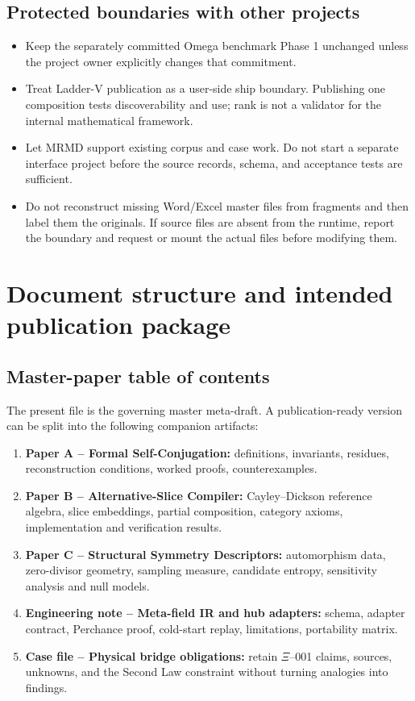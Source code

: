 \documentclass[11pt,oneside]{article}
\begin{document}
\subsection{Protected boundaries with other projects}
\begin{itemize}
  \item Keep the separately committed Omega benchmark Phase 1 unchanged unless the project owner explicitly changes that commitment.
  \item Treat Ladder-V publication as a user-side ship boundary. Publishing one composition tests discoverability and use; rank is not a validator for the internal mathematical framework.
  \item Let MRMD support existing corpus and case work. Do not start a separate interface project before the source records, schema, and acceptance tests are sufficient.
  \item Do not reconstruct missing Word/Excel master files from fragments and then label them the originals. If source files are absent from the runtime, report the boundary and request or mount the actual files before modifying them.
\end{itemize}

\section{Document structure and intended publication package}
\subsection{Master-paper table of contents}
The present file is the governing master meta-draft. A publication-ready version can be split into the following companion artifacts:
\begin{enumerate}
  \item \textbf{Paper A -- Formal Self-Conjugation:} definitions, invariants, residues, reconstruction conditions, worked proofs, counterexamples.
  \item \textbf{Paper B -- Alternative-Slice Compiler:} Cayley--Dickson reference algebra, slice embeddings, partial composition, category axioms, implementation and verification results.
  \item \textbf{Paper C -- Structural Symmetry Descriptors:} automorphism data, zero-divisor geometry, sampling measure, candidate entropy, sensitivity analysis and null models.
  \item \textbf{Engineering note -- Meta-field IR and hub adapters:} schema, adapter contract, Perchance proof, cold-start replay, limitations, portability matrix.
  \item \textbf{Case file -- Physical bridge obligations:} retain $\Xi$--001 claims, sources, unknowns, and the Second Law constraint without turning analogies into findings.
\end{enumerate}
\end{document}
